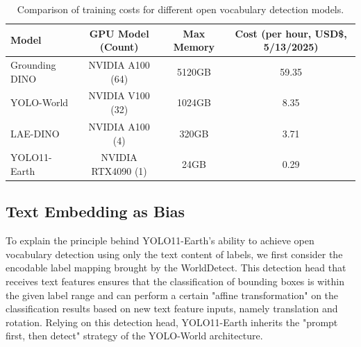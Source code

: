 \documentclass{article}
\begin{document}
\begin{table}[ht]
\centering
\caption{Comparison of training costs for different open vocabulary detection models.}
\begin{tabular}{lccc}
\toprule
\textbf{Model} & \textbf{GPU Model (Count)} & \textbf{Max Memory} & \textbf{Cost (per hour, USD\$, 5/13/2025)} \\
\midrule
Grounding DINO & NVIDIA A100 (64) & 5120GB & 59.35 \\
YOLO-World & NVIDIA V100 (32) & 1024GB & 8.35 \\
LAE-DINO & NVIDIA A100 (4) & 320GB & 3.71 \\
YOLO11-Earth & NVIDIA RTX4090 (1) & 24GB & 0.29 \\
\bottomrule
\end{tabular}
\end{table}

\subsection{Text Embedding as Bias}
To explain the principle behind YOLO11-Earth's ability to achieve open vocabulary detection using only the text 
content of labels, we first consider the encodable label mapping brought by the WorldDetect. This detection head 
that receives text features ensures that the classification of bounding boxes is within the given label range and 
can perform a certain "affine transformation" on the classification results based on new text feature inputs, 
namely translation and rotation. Relying on this detection head, YOLO11-Earth inherits the "prompt first, then 
detect" strategy of the YOLO-World architecture.
\end{document}
